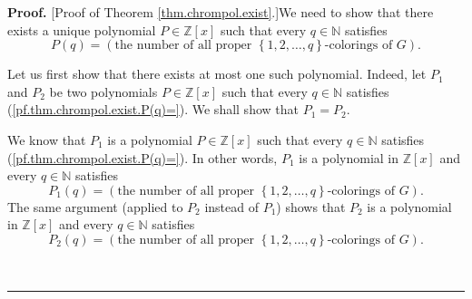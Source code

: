 \documentclass[numbers=enddot,12pt,final,onecolumn,notitlepage]{scrartcl}%
\theoremstyle{definition}
\newenvironment{proof}[1][Proof]{\noindent\textbf{#1.} }{\ \rule{0.5em}{0.5em}}
\newenvironment{verlong}{}{}
\begin{document}
\begin{verlong}
\begin{proof}
[Proof of Theorem \ref{thm.chrompol.exist}.]We need to show that there exists
a unique polynomial $P\in\mathbb{Z}\left[  x\right]  $ such that every
$q\in\mathbb{N}$ satisfies%
\begin{equation}
P\left(  q\right)  =\left(  \text{the number of all proper }\left\{
1,2,\ldots,q\right\}  \text{-colorings of }G\right)  .
\label{pf.thm.chrompol.exist.P(q)=}%
\end{equation}


Let us first show that there exists at most one such polynomial. Indeed, let
$P_{1}$ and $P_{2}$ be two polynomials $P\in\mathbb{Z}\left[  x\right]  $ such
that every $q\in\mathbb{N}$ satisfies (\ref{pf.thm.chrompol.exist.P(q)=}). We
shall show that $P_{1}=P_{2}$.

We know that $P_{1}$ is a polynomial $P\in\mathbb{Z}\left[  x\right]  $ such
that every $q\in\mathbb{N}$ satisfies (\ref{pf.thm.chrompol.exist.P(q)=}). In
other words, $P_{1}$ is a polynomial in $\mathbb{Z}\left[  x\right]  $ and
every $q\in\mathbb{N}$ satisfies
\begin{equation}
P_{1}\left(  q\right)  =\left(  \text{the number of all proper }\left\{
1,2,\ldots,q\right\}  \text{-colorings of }G\right)  .
\label{pf.thm.chrompol.exist.P1(q)=}%
\end{equation}
The same argument (applied to $P_{2}$ instead of $P_{1}$) shows that $P_{2}$
is a polynomial in $\mathbb{Z}\left[  x\right]  $ and every $q\in\mathbb{N}$
satisfies
\begin{equation}
P_{2}\left(  q\right)  =\left(  \text{the number of all proper }\left\{
1,2,\ldots,q\right\}  \text{-colorings of }G\right)  .
\label{pf.thm.chrompol.exist.P2(q)=}%
\end{equation}



\end{proof}
\end{verlong}
\end{document}
